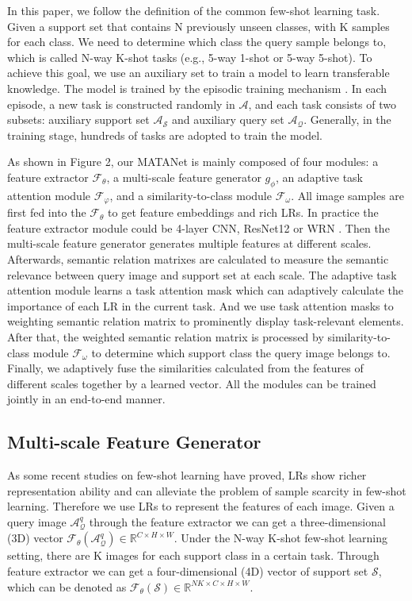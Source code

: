 \documentclass[final]{cvpr}
\begin{document}
	In this paper, we follow the definition of the common few-shot learning task.
	Given a support set that contains N previously unseen classes, with K samples for each class.
	We need to determine which class the query sample belongs to, which is called N-way K-shot tasks (e.g., 5-way 1-shot or 5-way 5-shot).
	To achieve this goal, we use an auxiliary set to train a model to learn transferable knowledge. The model is trained by the episodic training mechanism \cite{vinyals2016matching}. In each episode, a new task is constructed randomly in $\mathcal{A}$, and each task consists of two subsets: auxiliary support set $\mathcal{A_S}$ and auxiliary query set $\mathcal{A_Q}$. Generally, in the training stage, hundreds of tasks are adopted to train the model.
	
	As shown in Figure 2, our MATANet is mainly composed of four modules: a feature extractor $\mathcal{F}_{\theta}$, a multi-scale feature generator $g_{\phi}$, an adaptive task attention module $\mathcal{F}_{\varphi}$, and a similarity-to-class module $\mathcal{F}_{\omega }$. 
	All image samples are first fed into the $\mathcal{F}_{\theta}$ to get feature embeddings and rich LRs. In practice the feature extractor module could be 4-layer CNN, ResNet12 \cite{he2016deep} or WRN \cite{zagoruyko2016wide}. Then the multi-scale feature generator generates multiple features at different scales. Afterwards, semantic relation matrixes are calculated to measure the semantic relevance between query image and support set at each scale. The adaptive task attention module learns a task attention mask which can adaptively calculate the importance of each LR in the current task. And we use task attention masks to weighting semantic relation matrix to prominently display task-relevant elements. After that, the weighted semantic relation matrix is processed by similarity-to-class module $\mathcal{F}_{\omega }$ to determine which support class the query image belongs to. Finally, we adaptively fuse the similarities calculated from the features of different scales together by a learned vector. All the modules can be trained jointly in an end-to-end manner.
	\subsection{Multi-scale Feature Generator}
	As some recent studies \cite{li2019revisiting,li2019distribution} on few-shot learning have proved, LRs show richer representation ability and can alleviate the problem of sample scarcity in few-shot learning. Therefore we use LRs to represent the features of each image. Given a query image $\mathcal{A}^q_\mathcal{Q}$ through the feature extractor we can get a three-dimensional (3D) vector $\mathcal{F}_{\theta}(\mathcal{A}^q_\mathcal{Q})\in\mathbb{R}^{C\times H\times W}$. Under the  N-way K-shot few-shot learning setting, there are K images for each support class in a certain task. Through feature extractor we can get a four-dimensional (4D) vector of support set $\mathcal{S}$, which can be denoted as $\mathcal{F}_{\theta}(\mathcal{S})\in\mathbb{R}^{NK\times C\times H\times W}$.
	
\end{document}
